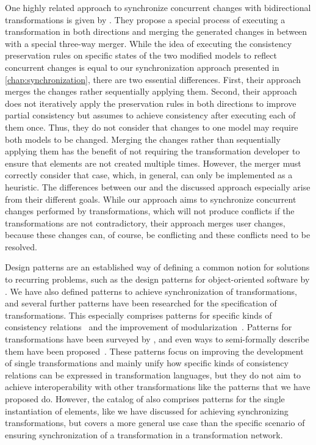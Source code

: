 One highly related approach to synchronize concurrent changes with bidirectional transformations is given by \textcite{xiong2009parallelUpdates-ICMT,xiong2013SynchronizingConcurrentUpdates-SoSym}.
They propose a special process of executing a transformation in both directions and merging the generated changes in between with a special three-way merger.
While the idea of executing the consistency preservation rules on specific states of the two modified models to reflect concurrent changes is equal to our synchronization approach presented in \autoref{chap:synchronization}, there are two essential differences.
First, their approach merges the changes rather sequentially applying them.
Second, their approach does not iteratively apply the preservation rules in both directions to improve partial consistency but assumes to achieve consistency after executing each of them once. Thus, they do not consider that changes to one model may require both models to be changed.
Merging the changes rather than sequentially applying them has the benefit of not requiring the transformation developer to ensure that elements are not created multiple times. However, the merger must correctly consider that case, which, in general, can only be implemented as a heuristic.
The differences between our and the discussed approach especially arise from their different goals. 
While our approach aims to synchronize concurrent changes performed by transformations, which will not produce conflicts if the transformations are not contradictory, their approach merges user changes, because these changes can, of course, be conflicting and these conflicts need to be resolved.

Design patterns are an established way of defining a common notion for solutions to recurring problems, such as the design patterns for object-oriented software by \textcite{gamma1995designPatterns-Book}.
We have also defined patterns to achieve synchronization of transformations, and several further patterns have been researched for the specification of transformations.
This especially comprises patterns for specific kinds of consistency relations~\cite{iacob2008a} and the improvement of modularization~\cite{lano2014a}.
Patterns for transformations have been surveyed by \textcite{lano2018a}, and even ways to semi-formally describe them have been proposed~\cite{huseyin2016patternsTransformations-CLSS}.
These patterns focus on improving the development of single transformations and mainly unify how specific kinds of consistency relations can be expressed in transformation languages, but they do not aim to achieve interoperability with other transformations like the patterns that we have proposed do.
However, the catalog of \textcite{lano2014a} also comprises patterns for the single instantiation of elements, like we have discussed for achieving synchronizing transformations, but covers a more general use case than the specific scenario of ensuring synchronization of a transformation in a transformation network.


